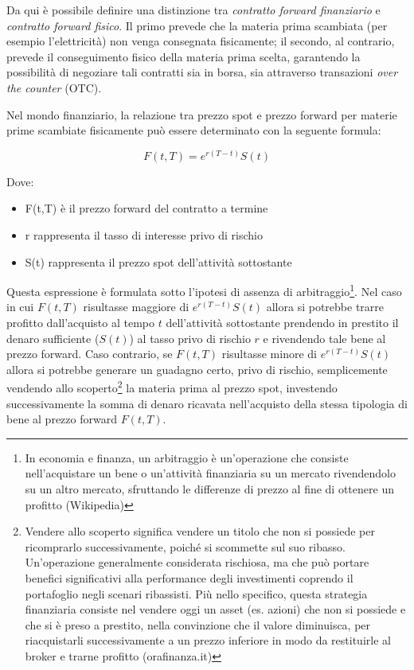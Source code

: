 \documentclass[12pt,a4paper]{report}
\begin{document}
Da qui è possibile definire una distinzione tra \textit{contratto forward finanziario} e \textit{contratto forward fisico}. Il primo prevede che la materia prima scambiata (per esempio l'elettricità) non venga consegnata fisicamente; il secondo, al contrario, prevede il conseguimento fisico della materia prima scelta, garantendo la possibilità di negoziare tali contratti sia in borsa, sia attraverso transazioni \textit{over the counter} (OTC).


Nel mondo finanziario, la relazione tra prezzo spot e prezzo forward per materie prime scambiate fisicamente può essere determinato con la seguente formula:

\begin{equation}
    F(t,T) = e^{r(T-t)} S(t)
\end{equation}

Dove:
\begin{itemize}
    \item F(t,T) è il prezzo forward del contratto a termine 
    \item r rappresenta il tasso di interesse privo di rischio
    \item S(t) rappresenta il prezzo spot dell'attività sottostante
\end{itemize}
    
Questa espressione è formulata sotto l'ipotesi di assenza di arbitraggio\footnote{In economia e finanza, un arbitraggio è un'operazione che consiste nell'acquistare un bene o un'attività finanziaria su un mercato rivendendolo su un altro mercato, sfruttando le differenze di prezzo al fine di ottenere un profitto (Wikipedia)}. Nel caso in cui $F(t,T)$ risultasse maggiore di $e^{r(T-t)} S(t)$ allora si potrebbe trarre profitto dall'acquisto al tempo $t$ dell'attività sottostante prendendo in prestito il denaro sufficiente ($S(t)$) al tasso privo di rischio $r$ e rivendendo tale bene al prezzo forward. Caso contrario, se $F(t,T)$ risultasse minore di $e^{r(T-t)} S(t)$ allora si potrebbe generare un guadagno certo, privo di rischio, semplicemente vendendo allo scoperto\footnote{Vendere allo scoperto significa vendere un titolo che non si possiede per ricomprarlo successivamente, poiché si scommette sul suo ribasso. Un’operazione generalmente considerata rischiosa, ma che può portare benefici significativi alla performance degli investimenti coprendo il portafoglio negli scenari ribassisti. Più nello specifico, questa strategia finanziaria consiste nel vendere oggi un asset (es. azioni) che non si possiede e che si è preso a prestito, nella convinzione che il valore diminuisca, per riacquistarli successivamente a un prezzo inferiore in modo da restituirle al broker e trarne profitto (orafinanza.it)} la materia prima al prezzo spot, investendo successivamente la somma di denaro ricavata nell'acquisto della stessa tipologia di bene al prezzo forward $F(t,T)$.
\end{document}
